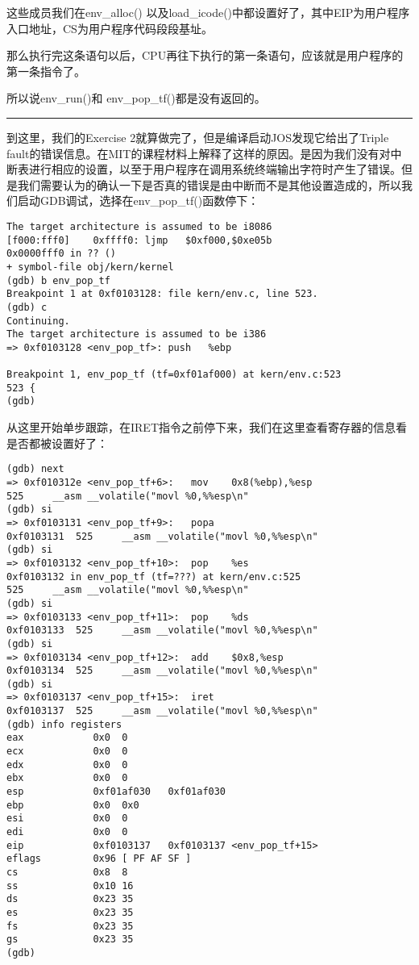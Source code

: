 \documentclass{article}
\newcommand{\funcname}[1]{{\ttfamily \small #1}}
\begin{document}
\begin{CJK*}{UTF8}{gkai}
这些成员我们在\funcname{env\_alloc()} 以及\funcname{load\_icode()}中都设置好了，其中EIP为用户程序入口地址，CS为用户程序代码段段基址。

那么执行完这条语句以后，CPU再往下执行的第一条语句，应该就是用户程序的第一条指令了。

所以说\funcname{env\_run()}和 \funcname{env\_pop\_tf()}都是没有返回的。

\vspace{2em}

\hrule

\vspace{2em}

到这里，我们的Exercise 2就算做完了，但是编译启动JOS发现它给出了Triple fault的错误信息。在MIT的课程材料上解释了这样的原因。是因为我们没有对中断表进行相应的设置，以至于用户程序在调用系统终端输出字符时产生了错误。但是我们需要认为的确认一下是否真的错误是由中断而不是其他设置造成的，所以我们启动GDB调试，选择在\funcname{env\_pop\_tf()}函数停下：

\begin{lstlisting}[style=console]
The target architecture is assumed to be i8086
[f000:fff0]    0xffff0:	ljmp   $0xf000,$0xe05b
0x0000fff0 in ?? ()
+ symbol-file obj/kern/kernel
(gdb) b env_pop_tf
Breakpoint 1 at 0xf0103128: file kern/env.c, line 523.
(gdb) c
Continuing.
The target architecture is assumed to be i386
=> 0xf0103128 <env_pop_tf>:	push   %ebp

Breakpoint 1, env_pop_tf (tf=0xf01af000) at kern/env.c:523
523	{
(gdb) 
\end{lstlisting}

从这里开始单步跟踪，在IRET指令之前停下来，我们在这里查看寄存器的信息看是否都被设置好了：

\begin{lstlisting}[style=console]
(gdb) next
=> 0xf010312e <env_pop_tf+6>:	mov    0x8(%ebp),%esp
525		__asm __volatile("movl %0,%%esp\n"
(gdb) si
=> 0xf0103131 <env_pop_tf+9>:	popa   
0xf0103131	525		__asm __volatile("movl %0,%%esp\n"
(gdb) si
=> 0xf0103132 <env_pop_tf+10>:	pop    %es
0xf0103132 in env_pop_tf (tf=???) at kern/env.c:525
525		__asm __volatile("movl %0,%%esp\n"
(gdb) si
=> 0xf0103133 <env_pop_tf+11>:	pop    %ds
0xf0103133	525		__asm __volatile("movl %0,%%esp\n"
(gdb) si
=> 0xf0103134 <env_pop_tf+12>:	add    $0x8,%esp
0xf0103134	525		__asm __volatile("movl %0,%%esp\n"
(gdb) si
=> 0xf0103137 <env_pop_tf+15>:	iret   
0xf0103137	525		__asm __volatile("movl %0,%%esp\n"
(gdb) info registers 
eax            0x0	0
ecx            0x0	0
edx            0x0	0
ebx            0x0	0
esp            0xf01af030	0xf01af030
ebp            0x0	0x0
esi            0x0	0
edi            0x0	0
eip            0xf0103137	0xf0103137 <env_pop_tf+15>
eflags         0x96	[ PF AF SF ]
cs             0x8	8
ss             0x10	16
ds             0x23	35
es             0x23	35
fs             0x23	35
gs             0x23	35
(gdb) 
\end{lstlisting}


\end{CJK*}
\end{document}
